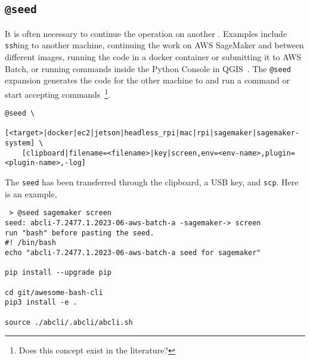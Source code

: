 \subsection{\texttt{@seed}}\label{seed}

It is often necessary to continue the operation on another . Examples include \texttt{ssh}ing to another machine, continuing the work on AWS SageMaker and between different images, running the code in a docker container or submitting it to AWS Batch, or running commands inside the Python Console in QGIS~\cite{QGIS_python_console}. The \texttt{@seed} expansion generates the code for the other machine to  and run a command or start accepting commands~\footnote{Does this concept exist in the literature?}.
%
\begin{verbatim}
@seed \
    [<target>|docker|ec2|jetson|headless_rpi|mac|rpi|sagemaker|sagemaker-system] \
    [clipboard|filename=<filename>|key|screen,env=<env-name>,plugin=<plugin-name>,-log]
\end{verbatim}
%
The \texttt{seed} has been transferred through the clipboard, a USB key, and \texttt{scp}. Here is an example,
%
\begin{verbatim}
 > @seed sagemaker screen
seed: abcli-7.2477.1.2023-06-aws-batch-a -sagemaker-> screen
run "bash" before pasting the seed.
#! /bin/bash
echo "abcli-7.2477.1.2023-06-aws-batch-a seed for sagemaker"

pip install --upgrade pip

cd git/awesome-bash-cli
pip3 install -e .

source ./abcli/.abcli/abcli.sh
\end{verbatim}